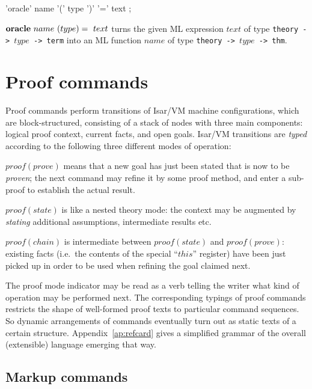 \begin{rail}
  'oracle' name '(' type ')' '=' text
  ;
\end{rail}

\begin{descr}
\item [${\mathord{\mathbf{oracle}}}~name~(type)=~text$] turns the given ML expression
  $text$ of type \texttt{theory~->~$type$~->~term} into an ML function $name$
  of type \texttt{theory~->~$type$~->~thm}.
\end{descr}


\section{Proof commands}

Proof commands perform transitions of Isar/VM machine configurations, which
are block-structured, consisting of a stack of nodes with three main
components: logical proof context, current facts, and open goals.  Isar/VM
transitions are \emph{typed} according to the following three different modes
of operation:
\begin{descr}
\item [$proof(prove)$] means that a new goal has just been stated that is now
  to be \emph{proven}; the next command may refine it by some proof method,
  and enter a sub-proof to establish the actual result.
\item [$proof(state)$] is like a nested theory mode: the context may be
  augmented by \emph{stating} additional assumptions, intermediate results
  etc.
\item [$proof(chain)$] is intermediate between $proof(state)$ and
  $proof(prove)$: existing facts (i.e.\ the contents of the special ``$this$''
  register) have been just picked up in order to be used when refining the
  goal claimed next.
\end{descr}

The proof mode indicator may be read as a verb telling the writer what kind of
operation may be performed next.  The corresponding typings of proof commands
restricts the shape of well-formed proof texts to particular command
sequences.  So dynamic arrangements of commands eventually turn out as static
texts of a certain structure.  Appendix~\ref{ap:refcard} gives a simplified
grammar of the overall (extensible) language emerging that way.


\subsection{Markup commands}\label{sec:markup-prf}


